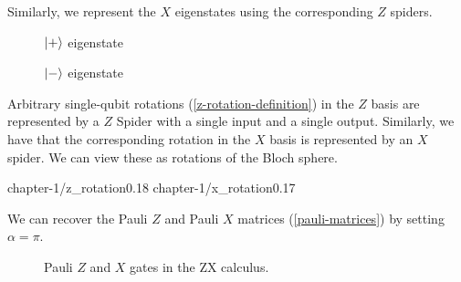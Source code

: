 Similarly, we represent the $X$ eigenstates using the corresponding $Z$ spiders.

\begin{figure}[H]
\centering
\begin{minipage}{.4\textwidth}
    \centering
    \caption{$\ket +$ eigenstate}
\end{minipage}%
\begin{minipage}{.4\textwidth}
    \centering
    \caption{$\ket -$ eigenstate}
    \label{x-eigenstates-zx}
\end{minipage}
\end{figure}

Arbitrary single-qubit rotations (\ref{z-rotation-definition}) in the $Z$ basis are represented by a $Z$ Spider with a single input and a single output. Similarly, we have that the corresponding rotation in the $X$ basis is represented by an $X$ spider. We can view these as rotations of the Bloch sphere.

{chapter-1/z_rotation}{0.18}
\vspace*{-15pt}
{chapter-1/x_rotation}{0.17}

We can recover the Pauli $Z$ and Pauli $X$ matrices (\ref{pauli-matrices}) by setting $\alpha = \pi$.

\begin{figure}[H]
\centering
{}
\caption{Pauli $Z$ and $X$ gates in the ZX calculus.}
\end{figure}

